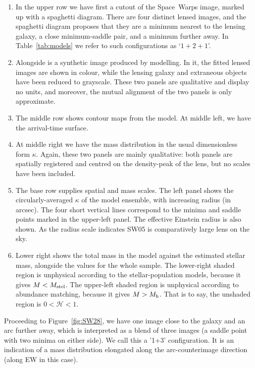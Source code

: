 \documentclass[fleqn,usenatbib]{mnras}
\newcommand{\figref}[1]{\ref{fig:#1}}
\newcommand{\Mstel}{M_{\rm stel}}
\newcommand{\Mhalo}{M_{\rm h}}
\newcommand{\haloindex}{\mathcal{H}}
\begin{document}
\begin{enumerate}
\item In the upper row we have first a cutout of the Space~Warps
  image, marked up with a spaghetti diagram.  There are four distinct
  lensed images, and the spaghetti diagram proposes that they are a
  minimum nearest to the lensing galaxy, a close minimum-saddle pair,
  and a minimum further away. In Table~\ref{tab:models} we refer to
  such configurations as `$1+2+1$'.
\item Alongside is a synthetic image produced by modelling.  In it,
  the fitted lensed images are shown in colour, while the lensing
  galaxy and extraneous objects have been reduced to grayscale.  These
  two panels are qualitative and display no units, and moreover, the
  mutual alignment of the two panels is only approximate.
\item The middle row shows contour maps from the model.  At middle
  left, we have the arrival-time surface.
\item At middle right we have the mass distribution in the usual
  dimensionless form $\kappa$.  Again, these two panels are mainly
  qualitative: both panels are spatially registered and centred on the
  density-peak of the lens, but no scales have been included.
\item The base row supplies spatial and mass scales.  The left panel
  shows the circularly-averaged $\kappa$ of the model ensemble, with
  increasing radius (in arcsec).  The four short vertical lines
  correspond to the minima and saddle points marked in the upper-left
  panel.  The effective Einstein radius is also shown.  As the radius
  scale indicates SW05 is comparatively large lens on the
  sky.
\item Lower right shows the total mass in the model against the
  estimated stellar mass, alongside the values for the whole sample.
  The lower-right shaded region is unphysical according to the
  stellar-population models, because it gives $M<\Mstel$. The
  upper-left shaded region is unphysical according to abundance
  matching, because it gives $M>\Mhalo$.  That is to say, the unshaded
  region is $0<\haloindex<1$.
\end{enumerate}

Proceeding to Figure~\figref{SW28}, we have one image close to the
galaxy and an arc further away, which is interpreted as a blend of
three images (a saddle point with two minima on either side).  We call
this a '1+3' configuration.  It is an indication of a mass
distribution elongated along the arc-counterimage direction (along EW
in this case).
\end{document}
